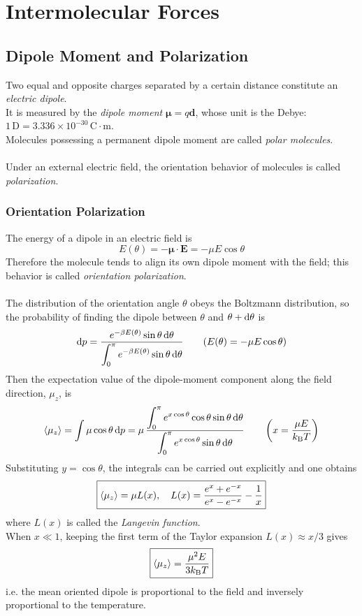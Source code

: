 \chapter{Intermolecular Forces}

\section{Dipole Moment and Polarization}

	Two equal and opposite charges separated by a certain distance constitute an \emph{electric dipole}. \\
	It is measured by the \emph{dipole moment} $\mathbf{\mu} = q\mathbf{d}$, whose unit is the Debye: $1\,\text{D} = 3.336\times 10^{-30}\,\text{C}\cdot\text{m}$. \\
	Molecules possessing a permanent dipole moment are called \emph{polar molecules}. \\\ \\
	Under an external electric field, the orientation behavior of molecules is called \emph{polarization}.

	\subsection{Orientation Polarization}

		The energy of a dipole in an electric field is
		\[E(\theta) = -\mathbf{\mu}\cdot\mathbf{E} = -\mu E\cos\theta\]
		Therefore the molecule tends to align its own dipole moment with the field; this behavior is called \emph{orientation polarization}. \\\ \\
		The distribution of the orientation angle $\theta$ obeys the Boltzmann distribution, so the probability of finding the dipole between $\theta$ and $\theta+\text{d}\theta$ is
		\[\text{d} p = \frac{e^{-\beta E(\theta)}\sin\theta\,\text{d}\theta}{\displaystyle\int_{0}^{\pi}e^{-\beta E(\theta)}\sin\theta\,\text{d}\theta}
		\qquad (E(\theta) = -\mu E\cos\theta)\]
		Then the expectation value of the dipole-moment component along the field direction, $\mu_z$, is
		\[\langle \mu_z \rangle = \int \mu\cos\theta\,\text{d} p
		= \mu\,\frac{\displaystyle\int_{0}^{\pi}e^{x\cos\theta}\cos\theta\sin\theta\,\text{d}\theta}
		{\displaystyle\int_{0}^{\pi}e^{x\cos\theta}\sin\theta\,\text{d}\theta}
		\qquad \left(x = \frac{\mu E}{k_{\text{B}}T}\right)\]
		Substituting $y = \cos\theta$, the integrals can be carried out explicitly and one obtains
		\[\boxed{\langle \mu_z \rangle = \mu L(x), \quad
		L(x) = \frac{e^{x}+e^{-x}}{e^{x}-e^{-x}} - \frac{1}{x}}\]
		where $L(x)$ is called the \emph{Langevin function}. \\
		When $x \ll 1$, keeping the first term of the Taylor expansion $L(x) \approx x/3$ gives
		\[\boxed{\langle \mu_z \rangle = \frac{\mu^{2}E}{3k_{\text{B}}T}}\]
		i.e. the mean oriented dipole is proportional to the field and inversely proportional to the temperature.

